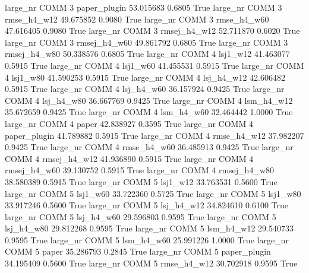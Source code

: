   large_nr     COMM                 3 paper_plugin   53.015683      0.6805    True
  large_nr     COMM                 3  rmse_h4_w12   49.675852      0.9080    True
  large_nr     COMM                 3  rmse_h4_w60   47.616405      0.9080    True
  large_nr     COMM                 3 rmsej_h4_w12   52.711870      0.6020    True
  large_nr     COMM                 3 rmsej_h4_w60   49.861792      0.6805    True
  large_nr     COMM                 3 rmsej_h4_w80   50.338576      0.6805    True
  large_nr     COMM                 4     lsj1_w12   41.463077      0.5915    True
  large_nr     COMM                 4     lsj1_w60   41.455531      0.5915    True
  large_nr     COMM                 4     lsj1_w80   41.590253      0.5915    True
  large_nr     COMM                 4   lsj_h4_w12   42.606482      0.5915    True
  large_nr     COMM                 4   lsj_h4_w60   36.157924      0.9425    True
  large_nr     COMM                 4   lsj_h4_w80   36.667769      0.9425    True
  large_nr     COMM                 4   lsm_h4_w12   35.672659      0.9425    True
  large_nr     COMM                 4   lsm_h4_w60   32.464442      1.0000    True
  large_nr     COMM                 4        paper   42.838927      0.3595    True
  large_nr     COMM                 4 paper_plugin   41.789882      0.5915    True
  large_nr     COMM                 4  rmse_h4_w12   37.982207      0.9425    True
  large_nr     COMM                 4  rmse_h4_w60   36.485913      0.9425    True
  large_nr     COMM                 4 rmsej_h4_w12   41.936890      0.5915    True
  large_nr     COMM                 4 rmsej_h4_w60   39.130752      0.5915    True
  large_nr     COMM                 4 rmsej_h4_w80   38.580389      0.5915    True
  large_nr     COMM                 5     lsj1_w12   33.763531      0.5600    True
  large_nr     COMM                 5     lsj1_w60   33.722360      0.5725    True
  large_nr     COMM                 5     lsj1_w80   33.917246      0.5600    True
  large_nr     COMM                 5   lsj_h4_w12   34.824610      0.6100    True
  large_nr     COMM                 5   lsj_h4_w60   29.596803      0.9595    True
  large_nr     COMM                 5   lsj_h4_w80   29.812268      0.9595    True
  large_nr     COMM                 5   lsm_h4_w12   29.540733      0.9595    True
  large_nr     COMM                 5   lsm_h4_w60   25.991226      1.0000    True
  large_nr     COMM                 5        paper   35.286793      0.2845    True
  large_nr     COMM                 5 paper_plugin   34.195409      0.5600    True
  large_nr     COMM                 5  rmse_h4_w12   30.702918      0.9595    True
